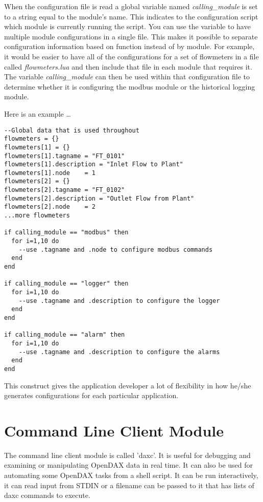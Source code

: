 When the configuration file is read a global variable named \emph{calling\_module} is set to a string equal to the module's name.  This indicates to the configuration script which module is currently running the script.  You can use the variable to have multiple module configurations in a single file.  This makes it possible to separate configuration information based on function instead of by module.  For example, it would be easier to have all of the configurations for a set of flowmeters in a file called \emph{flowmeters.lua} and then include that file in each module that requires it.  The variable \emph{calling\_module} can then be used within that configuration file to determine whether it is configuring the modbus module or the historical logging module.

Here is an example \ldots

\begin{verbatim}
--Global data that is used throughout
flowmeters = {}
flowmeters[1] = {}
flowmeters[1].tagname = "FT_0101"
flowmeters[1].description = "Inlet Flow to Plant"
flowmeters[1].node    = 1
flowmeters[2] = {}
flowmeters[2].tagname = "FT_0102"
flowmeters[2].description = "Outlet Flow from Plant"
flowmeters[2].node    = 2
...more flowmeters

if calling_module == "modbus" then
  for i=1,10 do
    --use .tagname and .node to configure modbus commands
  end
end

if calling_module == "logger" then
  for i=1,10 do
    --use .tagname and .description to configure the logger
  end
end

if calling_module == "alarm" then
  for i=1,10 do
    --use .tagname and .description to configure the alarms
  end
end
\end{verbatim}

This construct gives the application developer a lot of flexibility in how he/she generates configurations for each particular application.

\chapter{Command Line Client Module}
The command line client module is called 'daxc'.  It is useful for debugging and examining or manipulating OpenDAX data in real time.  It can also be used for automating some OpenDAX tasks from a shell script.  It can be run interactively, it can read input from STDIN or a filename can be passed to it that has lists of daxc commands to execute.

